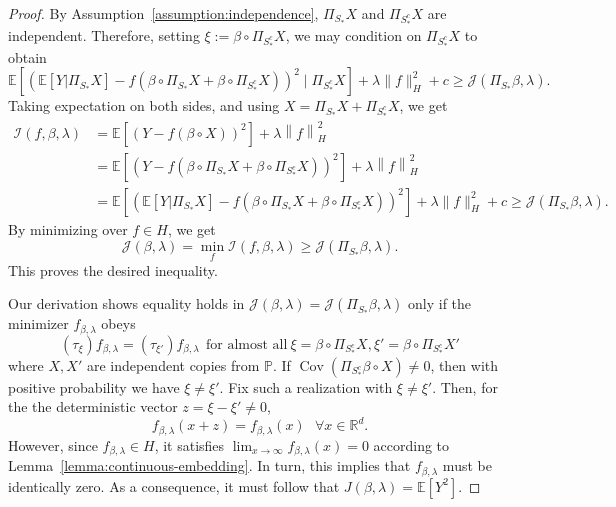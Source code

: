 \documentclass[sn-mathphys-num]{sn-jnl}%
\numberwithin{equation}{section}
\newcommand{\R}{\mathbb{R}}
\newcommand{\E}{\mathbb{E}}
\newcommand{\norm}[1]{\left\|{#1}\right\|} %
\renewcommand{\P}{\mathbb{P}}
\theoremstyle{thmstyleone}%
\theoremstyle{thmstyletwo}%
\theoremstyle{thmstylethree}%
\begin{document}
\begin{proof}
By Assumption~\ref{assumption:independence}, $\Pi_{S_*} X$ and $\Pi_{S_*^c} X$ are independent. Therefore, setting $\xi := \beta \circ \Pi_{S_*^c} X$, we may condition on $\Pi_{S_*^c} X$ to obtain
\[
  \E\left[(\E[Y|\Pi_{S_*} X] - f(\beta \circ \Pi_{S_*} X + \beta \circ \Pi_{S_*^c} X))^2 \mid  \Pi_{S_*^c} X\right] + \lambda \|f\|_H^2 + c \ge \mathcal{J}(\Pi_{S_*} \beta, \lambda).
\]
Taking expectation on both sides, and using $X = \Pi_{S_*} X + \Pi_{S_*^c} X$, we get 
\begin{equation*}
\begin{split} 
	\mathcal{I}(f, \beta, \lambda) 
		&=  \E[(Y - f( \beta \circ X))^2] + \lambda \norm{f}_H^2  \\
		&= \E[(Y - f( \beta \circ \Pi_{S_*} X + \beta \circ \Pi_{S_*^c} X))^2] + \lambda \norm{f}_H^2 \\
		&=   \E\left[(\E[Y|\Pi_{S_*} X] - f(\beta \circ \Pi_{S_*} X + \beta \circ \Pi_{S_*^c} X))^2\right] + \lambda \|f\|_H^2 + c 
			\ge  \mathcal{J}(\Pi_{S_*} \beta, \lambda).
\end{split} 
\end{equation*}
By minimizing over $f \in H$, we get 
\begin{equation*}
	\mathcal{J}(\beta, \lambda)= \min_f \mathcal{I}(f, \beta, \lambda)  \ge \mathcal{J}(\Pi_{S_*} \beta, \lambda).
\end{equation*}  
This proves the desired inequality. 

Our derivation shows equality holds in 
$\mathcal{J}(\beta, \lambda) = \mathcal{J}(\Pi_{S_*} \beta, \lambda)$
only if the minimizer $f_{\beta, \lambda}$ obeys 
\begin{equation*}
(\tau_{\xi}) f_{\beta, \lambda} = (\tau_{\xi'}) f_{\beta, \lambda}~~\text{for almost all}~\xi=\beta \circ \Pi_{S_*^c} X, \xi' = \beta \circ \Pi_{S_*^c}X'
\end{equation*}
where $X, X'$ are independent copies from $\P$. 
If $\operatorname{Cov}(\Pi_{S_*^c} \beta \circ  X) \ne 0$, then with positive probability we have $\xi \ne \xi'$. 
Fix such a realization with $\xi \ne \xi'$. Then, for the 
the deterministic vector $z = \xi - \xi' \ne 0$,
\begin{equation*}
	f_{\beta, \lambda}(x + z)  = f_{\beta, \lambda}(x)~~~\forall x\in \R^d.
\end{equation*}
However, since $f_{\beta, \lambda} \in H$, it satisfies $\lim_{x \to \infty} f_{\beta, \lambda}(x) = 0$ 
according to Lemma~\ref{lemma:continuous-embedding}. In turn, this implies that $f_{\beta, \lambda}$ must be identically zero. As a consequence, it must follow that $J(\beta, \lambda) = \E[Y^2]$.
\end{proof} 
\end{document}
